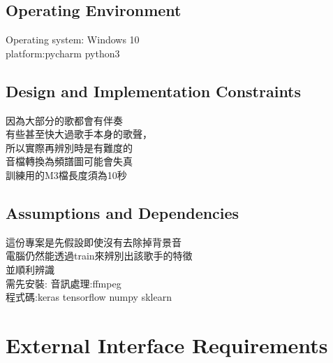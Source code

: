 \documentclass{article}
\begin{document}
\begin{CJK}{UTF8}{bkai}
\subsection{\Large Operating Environment \\}
 \Large Operating system: Windows 10\\
platform:pycharm python3\\

\subsection{\Large Design and Implementation Constraints\\}
   \Large 因為大部分的歌都會有伴奏 \\
有些甚至快大過歌手本身的歌聲，\\
所以實際再辨別時是有難度的\\
音檔轉換為頻譜圖可能會失真\\
訓練用的M3檔長度須為10秒
\subsection{\Large  Assumptions and Dependencies\\}
  \Large  這份專案是先假設即使沒有去除掉背景音\\
 電腦仍然能透過train來辨別出該歌手的特徵\\
並順利辨識\\
需先安裝:
音訊處理:ffmpeg\\
程式碼:keras tensorflow numpy sklearn
\newpage

\section{\huge\bf  \color{blue} External Interface Requirements\\}

\end{CJK}
\end{document}
